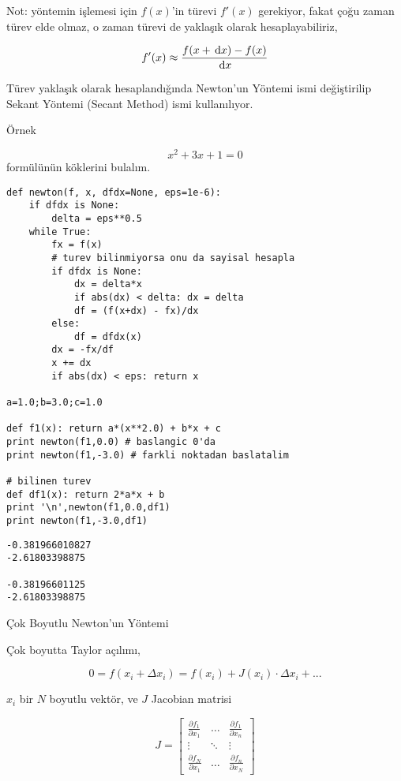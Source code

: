 \documentclass[12pt,fleqn]{article}\usepackage{../../common}
\begin{document}
Not: yöntemin işlemesi için $f(x)$'in türevi $f'(x)$ gerekiyor, fakat çoğu
zaman türev elde olmaz, o zaman türevi de yaklaşık olarak hesaplayabiliriz, 

$$ f'(x) \approx \frac{f(x + \,\mathrm{d} x) - f(x)}{\,\mathrm{d} x}$$

Türev yaklaşık olarak hesaplandığında Newton'un Yöntemi ismi değiştirilip
Sekant Yöntemi (Secant Method) ismi kullanılıyor.

Örnek

$$ x^2 + 3 x + 1 = 0$$ formülünün köklerini bulalım. 

\begin{verbatim}
def newton(f, x, dfdx=None, eps=1e-6):
    if dfdx is None: 
        delta = eps**0.5
    while True:
        fx = f(x)
        # turev bilinmiyorsa onu da sayisal hesapla
        if dfdx is None:
            dx = delta*x
            if abs(dx) < delta: dx = delta
            df = (f(x+dx) - fx)/dx
        else:
            df = dfdx(x)
        dx = -fx/df
        x += dx
        if abs(dx) < eps: return x

a=1.0;b=3.0;c=1.0

def f1(x): return a*(x**2.0) + b*x + c
print newton(f1,0.0) # baslangic 0'da
print newton(f1,-3.0) # farkli noktadan baslatalim

# bilinen turev 
def df1(x): return 2*a*x + b
print '\n',newton(f1,0.0,df1)
print newton(f1,-3.0,df1) 

\end{verbatim}

\begin{verbatim}
-0.381966010827
-2.61803398875

-0.38196601125
-2.61803398875
\end{verbatim}

Çok Boyutlu Newton'un Yöntemi

Çok boyutta Taylor açılımı,

$$ 
0 = f(x_i + \Delta x_i) = f(x_i) + J(x_i) \cdot \Delta x_i + ... 
$$

$x_i$ bir $N$ boyutlu vektör, ve $J$ Jacobian matrisi

$$ 
J = \left[\begin{array}{rrr}
\frac{\partial f_1}{\partial x_1}  & \dots & \frac{\partial f_1}{\partial x_n} \\
 \vdots & \ddots & \vdots \\
\frac{\partial f_N}{\partial x_1}  & \dots & \frac{\partial f_n}{\partial x_N} 
\end{array}\right]
$$
\end{document}
